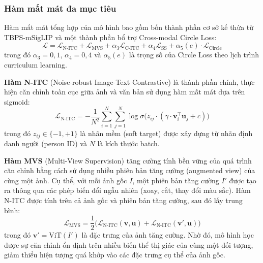 \documentclass{jstarticle}
\begin{document}
\subsubsection{Hàm mất mát đa mục tiêu}
Hàm mất mát tổng hợp của mô hình bao gồm bốn thành phần cơ sở kế thừa từ TBPS-mSigLIP và một thành phần bổ trợ Cross-modal Circle Loss:
\begin{equation}
    \mathcal{L} = \mathcal{L}_{\text{N-ITC}} + \mathcal{L}_{\text{MVS}} + \alpha_3 \mathcal{L}_{\text{C-ITC}} + \alpha_4 \mathcal{L}_{\text{SS}} + \alpha_5(e) \cdot \mathcal{L}_{\text{Circle}}
\label{eq:total-loss}
\end{equation}
trong đó $\alpha_3 = 0{,}1$, $\alpha_4 = 0{,}4$ và $\alpha_5(e)$ là trọng số của Circle Loss theo lịch trình curriculum learning.

\textbf{Hàm N-ITC} (Noise-robust Image-Text Contrastive) là thành phần chính, thực hiện căn chỉnh toàn cục giữa ảnh và văn bản sử dụng hàm mất mát dựa trên sigmoid:
\begin{equation}
    \mathcal{L}_{\text{N-ITC}} = -\frac{1}{N^2} \sum_{i=1}^{N} \sum_{j=1}^{N} \log \sigma\bigl(z_{ij} \cdot (\gamma \cdot \mathbf{v}_i^\top \mathbf{u}_j + c)\bigr)
\label{eq:nitc}
\end{equation}
trong đó $z_{ij} \in \{-1, +1\}$ là nhãn mềm (soft target) được xây dựng từ nhãn định danh người (person ID) và $N$ là kích thước batch.

\textbf{Hàm MVS} (Multi-View Supervision) tăng cường tính bền vững của quá trình căn chỉnh bằng cách sử dụng nhiều phiên bản tăng cường (augmented view) của cùng một ảnh. Cụ thể, với mỗi ảnh gốc $I$, một phiên bản tăng cường $I'$ được tạo ra thông qua các phép biến đổi ngẫu nhiên (xoay, cắt, thay đổi màu sắc). Hàm N-ITC được tính trên cả ảnh gốc và phiên bản tăng cường, sau đó lấy trung bình:
\begin{equation}
    \mathcal{L}_{\text{MVS}} = \frac{1}{2}\Big(\mathcal{L}_{\text{N-ITC}}(\mathbf{v}, \mathbf{u}) + \mathcal{L}_{\text{N-ITC}}(\mathbf{v}', \mathbf{u})\Big)
\label{eq:mvs}
\end{equation}
trong đó $\mathbf{v}' = \text{ViT}(I')$ là đặc trưng của ảnh tăng cường. Nhờ đó, mô hình học được sự căn chỉnh ổn định trên nhiều biến thể thị giác của cùng một đối tượng, giảm thiểu hiện tượng quá khớp vào các đặc trưng cụ thể của ảnh gốc.
\end{document}

